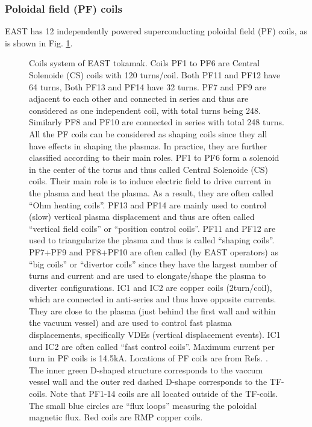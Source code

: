 \documentclass{article}
\begin{document}
\subsubsection{Poloidal field (PF) coils}

EAST has 12 independently powered superconducting poloidal field (PF) coils,
as is shown in Fig. \ref{19-5-4-p1}.

\begin{figure}[h]
  \caption{\label{19-5-4-p1}Coils system of EAST tokamak. Coils PF1 to PF6 are
  Central Solenoide (CS) coils with 120 turns/coil. Both PF11 and PF12 have 64
  turns, Both PF13 and PF14 have 32 turns. PF7 and PF9 are adjacent to each
  other and connected in series and thus are considered as one independent
  coil, with total turns being 248. Similarly PF8 and PF10 are connected in
  series with total 248 turns. All the PF coils can be considered as shaping
  coils since they all have effects in shaping the plasmas. In practice, they
  are further classified according to their main roles. PF1 to PF6 form a
  solenoid in the center of the torus and thus called Central Solenoide (CS)
  coils. Their main role is to induce electric field to drive current in the
  plasma and heat the plasma. As a result, they are often called ``Ohm heating
  coils''. PF13 and PF14 are mainly used to control (slow) vertical plasma
  displacement and thus are often called ``vertical field coils'' or
  ``position control coils''. PF11 and PF12 are used to triangularize the
  plasma and thus is called ``shaping coils''. PF7+PF9 and PF8+PF10 are often
  called (by EAST operators) as ``big coils'' or ``divertor coils'' since they
  have the largest number of turns and current and are used to elongate/shape
  the plasma to diverter configurations. IC1 and IC2 are copper coils
  (2turn/coil), which are connected in anti-series and thus have opposite
  currents. They are close to the plasma (just behind the first wall and
  within the vacuum vessel) and are used to control fast plasma displacements,
  specifically VDEs (vertical displacement events). IC1 and IC2 are often
  called ``fast control coils''. Maximum current per turn in PF coils is
  14.5kA. Locations of PF coils are from Refs.
  {\cite{ysun2012}}{\cite{yychen2019}}. The inner green D-shaped structure
  corresponds to the vaccum vessel wall and the outer red dashed D-shape
  corresponds to the TF-coils. Note that PF1-14 coils are all located outside
  of the TF-coils. The small blue circles are ``flux loops'' measuring the
  poloidal magnetic flux. Red coils are RMP copper coils.}
\end{figure}
\end{document}
